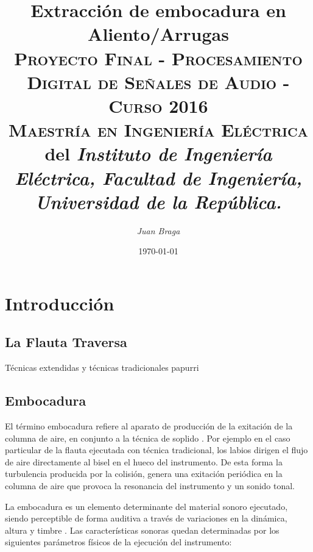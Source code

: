 \documentclass{article}
\title{\textbf{Extracción de embocadura en Aliento/Arrugas}\\\large \textsc{Proyecto Final - Procesamiento Digital de Señales de Audio - Curso 2016}\\
 \textsc{Maestría en Ingeniería Eléctrica} del \textit{Instituto de Ingeniería Eléctrica, Facultad de Ingeniería, Universidad de la República.}}
\author{\textit{Juan Braga}}
\date{\today}
\begin{document}
\maketitle 


\section{Introducción}
\subsection{La Flauta Traversa}
Técnicas extendidas y técnicas tradicionales papurri

\subsection{Embocadura}
\label{embocadura}
El término embocadura refiere al aparato de producción de la exitación de la columna de aire, en conjunto a la técnica de soplido \citep[Capítulo~6]{piston1955orchestration}. Por ejemplo en el caso particular de la flauta ejecutada con técnica tradicional, los labios dirigen el flujo de aire directamente al bisel en el hueco del instrumento. De esta forma la turbulencia producida por la colisión, genera una exitación periódica en la columna de aire que provoca la resonancia del instrumento y un sonido tonal. 
\medskip

La embocadura es un elemento determinante del material sonoro ejecutado, siendo perceptible de forma auditiva a través de variaciones en la dinámica, altura y timbre \citep[Capítulo~2]{dick1975other}. Las características sonoras quedan determinadas por los siguientes parámetros físicos de la ejecución del instrumento:
\end{document}
